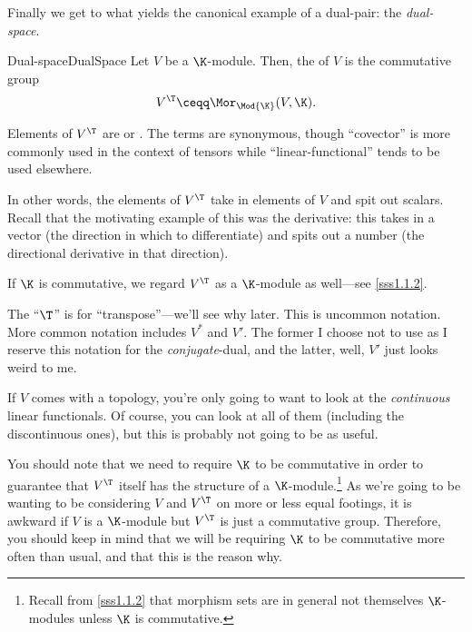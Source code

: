 Finally we get to what yields the canonical example of a dual-pair:  the \emph{dual-space}.
\begin{dfn}{Dual-space}{DualSpace}
	Let $V$ be a $\K$-module.  Then, the  of $V$ is the commutative group
	\begin{equation}
	V^{\T}\ceqq \Mor _{\Mod{\K}}(V,\K ).
	\end{equation}
	\begin{rmk}
		Elements of $V^{\T}$ are  or .  The terms are synonymous, though ``covector'' is more commonly used in the context of tensors while ``linear-functional'' tends to be used elsewhere.
	\end{rmk}
	\begin{rmk}
		In other words, the elements of $V^{\T}$ take in elements of $V$ and spit out scalars.  Recall that the motivating example of this was the derivative:  this takes in a vector (the direction in which to differentiate) and spits out a number (the directional derivative in that direction).
	\end{rmk}
	\begin{rmk}
		If $\K$ is commutative, we regard $V^{\T}$ as a $\K$-module as well---see \cref{sss1.1.2}.
	\end{rmk}
	\begin{rmk}
		The ``$\T$'' is for ``transpose''---we'll see why later.  This is uncommon notation.  More common notation includes $V^*$ and $V'$.  The former I choose not to use as I reserve this notation for the \emph{conjugate}-dual, and the latter, well, $V'$ just looks weird to me.
	\end{rmk}
	\begin{rmk}
		If $V$ comes with a topology, you're only going to want to look at the \emph{continuous} linear functionals.  Of course, you can look at all of them (including the discontinuous ones), but this is probably not going to be as useful.
	\end{rmk}
\end{dfn}
You should note that we need to require $\K$ to be commutative in order to guarantee that $V^{\T}$ itself has the structure of a $\K$-module.\footnote{Recall from \cref{sss1.1.2} that morphism sets are in general not themselves $\K$-modules unless $\K$ is commutative.}  As we're going to be wanting to be considering $V$ and $V^{\T}$ on more or less equal footings, it is awkward if $V$ is a $\K$-module but $V^{\T}$ is just a commutative group.  Therefore, you should keep in mind that we will be requiring $\K$ to be commutative more often than usual, and that this is the reason why.

